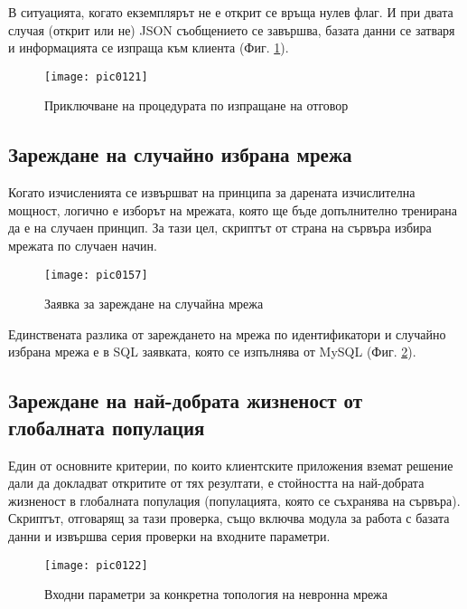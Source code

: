 В ситуацията, когато екземплярът не е открит се връща нулев флаг. И при двата случая (открит или не) JSON съобщението се завършва, базата данни се затваря и информацията се изпраща към клиента (Фиг. \ref{fig:pic0121}).

\begin{figure}[h]
  \centering
  \texttt{[image: pic0121]}
  \caption{Приключване на процедурата по изпращане на отговор}
\label{fig:pic0121}
\end{figure}
\FloatBarrier

\subsection{Зареждане на случайно избрана мрежа}

Когато изчисленията се извършват на принципа за дарената изчислителна мощност, логично е изборът на мрежата, която ще бъде допълнително тренирана  да е на случаен принцип. За тази цел, скриптът от страна на сървъра избира мрежата по случаен начин.

\begin{figure}[h]
  \centering
  \texttt{[image: pic0157]}
  \caption{Заявка за зареждане на случайна мрежа}
\label{fig:pic0157}
\end{figure}
\FloatBarrier

Единствената разлика от зареждането на мрежа по идентификатори и случайно избрана мрежа е в SQL заявката, която се изпълнява от MySQL (Фиг. \ref{fig:pic0157}).

\subsection{Зареждане на най-добрата жизненост от глобалната популация}

Един от основните критерии, по които клиентските приложения вземат решение дали да докладват откритите от тях резултати, е стойността на най-добрата жизненост в глобалната популация (популацията, която се съхранява на сървъра). Скриптът, отговарящ за тази проверка, също включва модула за работа с базата данни и извършва серия проверки на входните параметри. 

\begin{figure}[h]
  \centering
  \texttt{[image: pic0122]}
  \caption{Входни параметри за конкретна топология на невронна мрежа}
\label{fig:pic0122}
\end{figure}
\FloatBarrier

